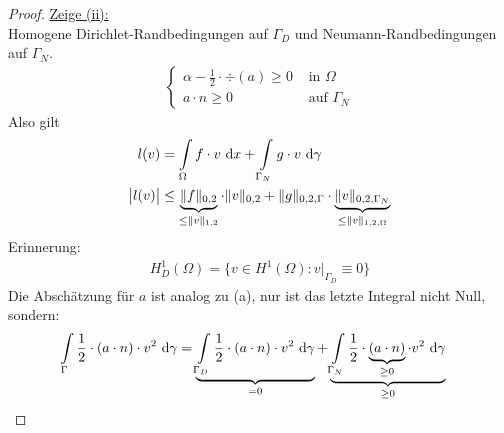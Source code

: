 \begin{proof}
	\underline{Zeige (ii):}\\
	Homogene Dirichlet-Randbedingungen auf $\Gamma_D$ und Neumann-Randbedingungen auf $\Gamma_N$.
	\begin{align*}
		\left\{\begin{array}{rl}
			\alpha-\frac{1}{2}\cdot\div(a)\geq0 &\text{ in }\Omega\\
			a\cdot n\geq0&\text{ auf }\Gamma_N
		\end{array}\right.
	\end{align*}
	Also gilt
	\begin{align*}
		l(v)&=\int\limits_\Omega f\cdot v\text{ d} x+\int\limits_{\Gamma_N}g\cdot v\text{ d}\gamma\\
		\big|l(v)\big|&\leq\underbrace{\Vert f\Vert_{0,2}}_{\leq\Vert v\Vert_{1,2}}\cdot\Vert v\Vert_{0,2}+\Vert g\Vert_{0,2,\Gamma}\cdot\underbrace{\Vert v\Vert_{0,2,\Gamma_N}}_{\leq\Vert v\Vert_{1,2,\Omega}}
	\end{align*}
	Erinnerung:
	\begin{align*}
		H^1_D(\Omega)=\big\lbrace v\in H^1(\Omega):v|_{\Gamma_D}\equiv 0\big\rbrace
	\end{align*}
	Die Abschätzung für $a$ ist analog zu (a), nur ist das letzte Integral nicht Null, sondern:
	\begin{align*}
		\int\limits_\Gamma\frac{1}{2}\cdot(a\cdot n)\cdot v^2\text{ d}\gamma
		&=\underbrace{\int\limits_{\Gamma_D}\frac{1}{2}\cdot(a\cdot n)\cdot v^2\text{ d}\gamma}_{=0}+\underbrace{\int\limits_{\Gamma_N}\frac{1}{2}\cdot\underbrace{(a\cdot n)}_{\geq0}\cdot v^2\text{ d}\gamma}_{\geq0}
	\end{align*}


\end{proof}
